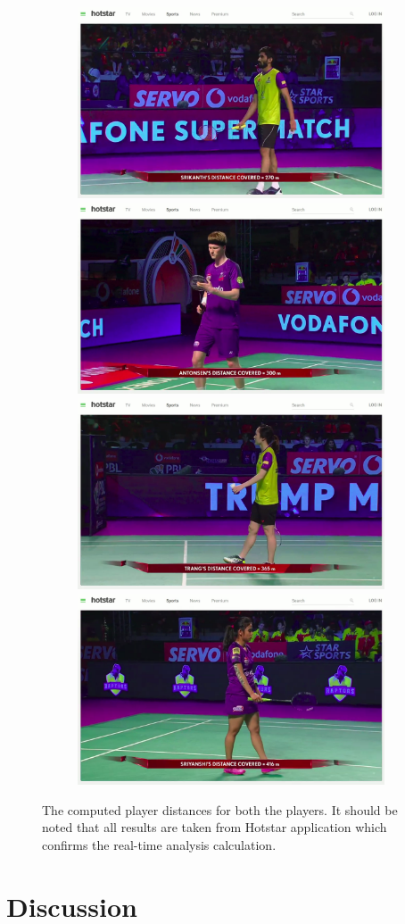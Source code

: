 \documentclass[runningheads,a4paper]{llncs}
\begin{document}
\begin{figure}
\begin{subfigure}{\linewidth}
        \includegraphics[width=.5\linewidth]{Images/result5.png}\hfill
        \includegraphics[width=.5\linewidth]{Images/result6.png}\hfill
        \includegraphics[width=.5\linewidth]{Images/result7.png}\hfill
        \includegraphics[width=.5\linewidth]{Images/result8.png}
    \end{subfigure}
    \caption{\label{fig:result}The computed player distances for both the players. It should be noted that all results are taken from Hotstar application which confirms the real-time analysis calculation.}
\end{figure}
\fi

\section{Discussion}
\end{document}
